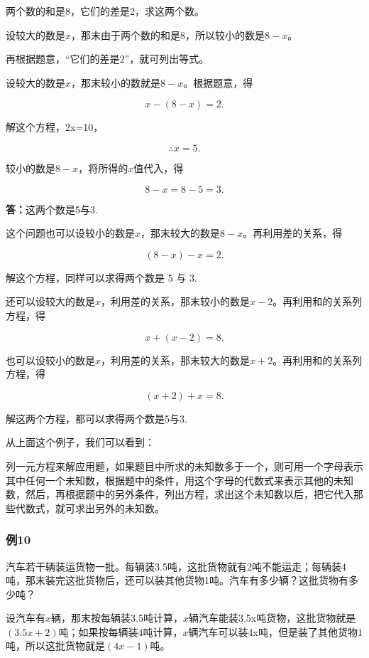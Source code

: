 两个数的和是8，它们的差是2，求这两个数。

设较大的数是\(x\)，那末由于两个数的和是8，所以较小的数是\(8 - x\)。

再根据题意，``它们的差是\(2\)''，就可列出等式。

设较大的数是\(x\)，那末较小的数就是\(8 - x\)。根据题意，得

\[
x - (8 - x) = 2.
\]

解这个方程，2x=10，

\[
\therefore x = 5.
\]

较小的数是\(8 - x\)，将所得的\(x\)值代入，得

\[
8 - x = 8 - 5 = 3.
\]

\textbf{答：}这两个数是5与3.

这个问题也可以设较小的数是\(x\)，那末较大的数是\(8 - x\)。再利用差的关系，得

\[
(8 - x) - x = 2.
\]

解这个方程，同样可以求得两个数是 5 与 3.

还可以设较大的数是\(x\)，利用差的关系，那末较小的数是\(x - 2\)。再利用和的关系列方程，得

\[
x + (x - 2) = 8.
\]

也可以设较小的数是\(x\)，利用差的关系，那末较大的数是\(x + 2\)。再利用和的关系列方程，得

\[
(x + 2) + x = 8.
\]

解这两个方程，都可以求得两个数是5与3.

从上面这个例子，我们可以看到：

列一元方程来解应用题，如果题目中所求的未知数多于一个，则可用一个字母表示其中任何一个未知数，根据题中的条件，用这个字母的代数式来表示其他的未知数，然后，再根据题中的另外条件，列出方程，求出这个未知数以后，把它代入那些代数式，就可求出另外的未知数。

\subsubsection{例10}

汽车若干辆装运货物一批。每辆装3.5吨，这批货物就有2吨不能运走；每辆装4吨，那末装完这批货物后，还可以装其他货物1吨。汽车有多少辆？这批货物有多少吨？


设汽车有\(x\)辆，那末按每辆装3.5吨计算，\(x\)辆汽车能装3.5x吨货物，这批货物就是\((3.5x + 2)\)吨；如果按每辆装4吨计算，\(x\)辆汽车可以装4x吨，但是装了其他货物1吨，所以这批货物就是\((4x - 1)\)吨。

